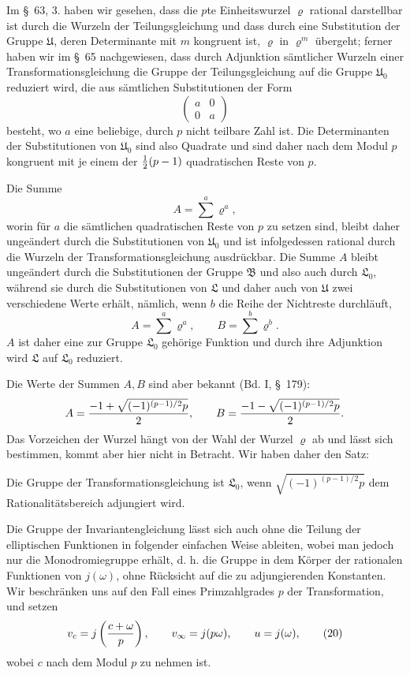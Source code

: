 \documentclass[11pt]{article}
\begin{document}
Im \S~63, 3. haben wir gesehen, dass die $p$te Einheitswurzel $\varrho$ rational darstellbar ist durch die Wurzeln der Teilungsgleichung und dass durch eine Substitution der Gruppe $\mathfrak U$, deren Determinante mit $m$ kongruent ist, $\varrho$ in $\varrho^m$ übergeht; ferner haben wir im \S~65 nachgewiesen, dass durch Adjunktion sämtlicher Wurzeln einer Transformationsgleichung die Gruppe der Teilungsgleichung auf die Gruppe $\mathfrak U_0$ reduziert wird, die aus sämtlichen Substitutionen der Form
\begin{equation}
\begin{pmatrix}a&0\\0&a\end{pmatrix}
\tag{18}
\end{equation}
besteht, wo $a$ eine beliebige, durch $p$ nicht teilbare Zahl ist. Die Determinanten der Substitutionen von $\mathfrak U_0$ sind also Quadrate und sind daher nach dem Modul $p$ kongruent mit je einem der ${1\over2}(p-1)$ quadratischen Reste von $p$.

Die Summe
\begin{equation}
 A=\sum^a \varrho^a,
\tag{19}
\end{equation}
worin für $a$ die sämtlichen quadratischen Reste von $p$ zu setzen sind, bleibt daher ungeändert durch die Substitutionen von $\mathfrak U_0$ und ist infolgedessen rational durch die Wurzeln der Transformationsgleichung ausdrückbar. Die Summe $A$ bleibt ungeändert durch die Substitutionen der Gruppe $\mathfrak B$ und also auch durch $\mathfrak L_0$, während sie durch die Substitutionen von $\mathfrak L$ und daher auch von $\mathfrak U$ zwei verschiedene Werte erhält, nämlich, wenn $b$ die Reihe der Nichtreste durchläuft,
\[
 A=\sum^a\varrho^a,
 \qquad
 B=\sum^b\varrho^b.
\]
$A$ ist daher eine zur Gruppe $\mathfrak L_0$ gehörige Funktion und durch ihre Adjunktion wird $\mathfrak L$ auf $\mathfrak L_0$ reduziert.

Die Werte der Summen $A,B$ sind aber bekannt (Bd. I, \S~179):
\[
 A={-1+\sqrt{(-1)^{(p-1)/2}p}\over2},
 \qquad
 B={-1-\sqrt{(-1)^{(p-1)/2}p}\over2}.
\]
Das Vorzeichen der Wurzel hängt von der Wahl der Wurzel $\varrho$ ab und lässt sich bestimmen, kommt aber hier nicht in Betracht. Wir haben daher den Satz:

Die Gruppe der Transformationsgleichung ist $\mathfrak L_0$, wenn $\sqrt{(-1)^{(p-1)/2}p}$ dem Rationalitätsbereich adjungiert wird.

Die Gruppe der Invariantengleichung lässt sich auch ohne die Teilung der elliptischen Funktionen in folgender einfachen Weise ableiten, wobei man jedoch nur die Monodromiegruppe erhält, d. h. die Gruppe in dem Körper der rationalen Funktionen von $j(\omega)$, ohne Rücksicht auf die zu adjungierenden Konstanten. Wir beschränken uns auf den Fall eines Primzahlgrades $p$ der Transformation, und setzen
\begin{equation}
 v_c=j\left({c+\omega\over p}\right),
 \qquad
 v_\infty=j(p\omega),
 \qquad
 u=j(\omega),
\tag{20}
\end{equation}
wobei $c$ nach dem Modul $p$ zu nehmen ist.
\end{document}
